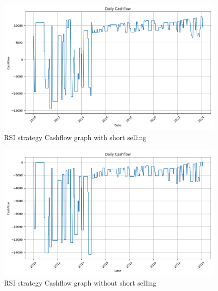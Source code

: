 \documentclass[11pt]{article}
\begin{document}
\begin{figure}[H]
  \centering
  \includegraphics[width=1\textwidth]{RSI_with_short.png}
  \caption{RSI strategy Cashflow graph with short selling}
\end{figure}

\begin{figure}[H]
  \centering
  \includegraphics[width=1\textwidth]{RSi_without_short.png}
  \caption{RSI strategy Cashflow graph without short selling}
\end{figure}
\end{document}

